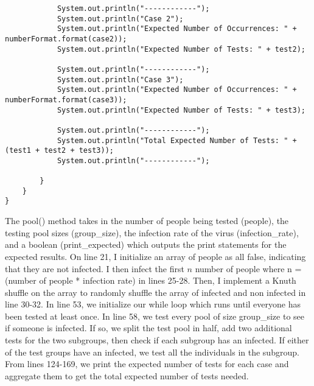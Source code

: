 \documentclass{article}
\begin{document}
\begin{lstlisting}
            System.out.println("------------");
            System.out.println("Case 2");
            System.out.println("Expected Number of Occurrences: " + numberFormat.format(case2));
            System.out.println("Expected Number of Tests: " + test2);

            System.out.println("------------");
            System.out.println("Case 3");
            System.out.println("Expected Number of Occurrences: " + numberFormat.format(case3));
            System.out.println("Expected Number of Tests: " + test3);

            System.out.println("------------");
            System.out.println("Total Expected Number of Tests: " + (test1 + test2 + test3));
            System.out.println("------------");

        }
    }
}

    \end{lstlisting}
The pool() method takes in the number of people being tested (people), the testing pool sizes (group\_size), the infection rate of the virus (infection\_rate), and a boolean (print\_expected) which outputs the print statements for the expected results.  On line 21, I initialize an array of people as all false, indicating that they are not infected.  I then infect the first $n$ number of people where n = (number of people * infection rate) in lines 25-28.  Then, I implement a Knuth shuffle on the array to randomly shuffle the array of infected and non infected in line 30-32. In line 53, we initialize our while loop which runs until everyone has been tested at least once.  In line 58, we test every pool of size group\_size to see if someone is infected. If so, we split the test pool in half, add two additional tests for the two subgroups, then check if each subgroup has an infected. If either of the test groups have an infected, we test all the individuals in the subgroup. From lines 124-169, we print the expected number of tests for each case and aggregate them to get the total expected number of tests needed.
\end{document}
